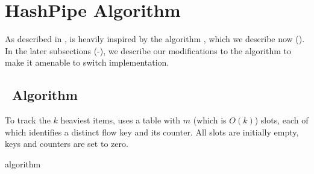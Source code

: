 \newcommand{\baselineAlgorithm}{%
\begin{algorithm}
\SetAlgoLined
$i = 0$\;
\lnl{loop} \While{i $<$ d}{
$l = h_i(ikey)$\;
\uIf{$key_l = ikey$}{$val_l$++; end\;}
\uElseIf{$val_l = 0$}{l = (ikey, 1); end\;}
\Else{$min = update(min)$\;}
$i$++\;
}
\uIf{$i = d$}{$min = (ikey, val_{min} + 1)$\;}
\end{algorithm}}

\newcommand{\OurAlgorithm}{%
\begin{algorithm}
\SetAlgoLined
$i = 0, cKey = iKey, cVal = 1$\;
\lnl{loop} \While{i $<$ d}{
$l = h_i(cKey)$\;
\uIf{$key_l = ckey$}{$val_l$ += $cVal$; end\;}
\uElseIf{$val_l = 0$}{l = (ckey, cVal); end\;}
\uElseIf{$val_l < cVal$}{swap $(key_l, val_l)$ with $(cKey, cVal)$\;}
$i$++\;
}
\end{algorithm}}

\section{HashPipe Algorithm}\label{sec:algorithm} 

As described in , \TheSystem is heavily inspired by the \spacesaving algorithm \cite{metwally2005efficient}, which we describe now
(). In the later subsections
(-), we describe our modifications to
the algorithm to make it amenable to switch implementation.
%

\subsection{\SpaceSaving\ Algorithm}
\label{sec:spacesaving}

To track the $k$ heaviest items, \spacesaving uses a table with $m$ (which is
$O(k)$) slots, each of which identifies a distinct flow key and its counter. All
slots are initially empty, \ie keys and counters are set to zero.

\begin{algorithm}
\DontPrintSemicolon %
\;

\caption{\spacesaving algorithm~\cite{metwally2005efficient}}
\label{algo:spacesaving}
\end{algorithm}

